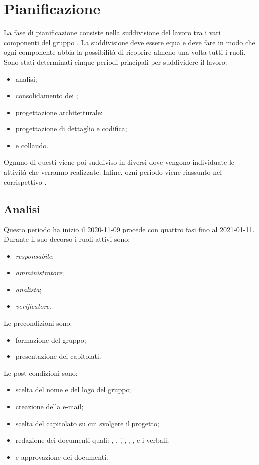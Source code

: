 \section{Pianificazione}
La fase di pianificazione consiste nella suddivisione del lavoro tra i vari componenti del gruppo \Gruppo . La suddivisione deve essere equa e deve fare in modo che ogni componente abbia la possibilità di ricoprire almeno una volta tutti i ruoli.
Sono stati determinati cinque periodi principali per suddividere il lavoro:
\begin{itemize}
\item analisi;
\item consolidamento dei ;
\item progettazione architetturale;
\item progettazione di dettaglio e codifica;
\item {} e collaudo.
\end{itemize}
Ognuno di questi viene poi suddiviso in diversi  dove vengono individuate le attività che verranno realizzate.
Infine, ogni periodo viene riassunto nel corrispettivo .
\subsection{Analisi}
Questo periodo ha inizio il 2020-11-09 procede con quattro fasi fino al 2021-01-11.
Durante il suo decorso i ruoli attivi sono:
\begin{itemize}
\item \textit{responsabile};
\item \textit{amministratore};
\item \textit{analista};
\item \textit{verificatore}.
\end{itemize}
Le precondizioni sono:
\begin{itemize}
	\item formazione del gruppo;
	\item presentazione dei capitolati.
\end{itemize}
Le post condizioni sono:
\begin{itemize}
	\item scelta del nome e del logo del gruppo;
	\item creazione della e-mail;
	\item scelta del capitolato su cui svolgere il progetto;
	\item redazione dei documenti quali: \SdF{}, \NdP{}, \PdP{}, \G{}, \LdP{}, \PdQ{}, \AdR{} e i verbali;
	\item {} e approvazione dei documenti.
\end{itemize}
